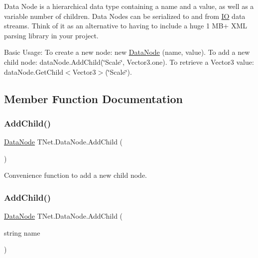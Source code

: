 Data Node is a hierarchical data type containing a name and a value, as well as a variable number of children. Data Nodes can be serialized to and from \mbox{\hyperlink{namespace_t_net_1_1_i_o}{IO}} data streams. Think of it as an alternative to having to include a huge 1 M\+B+ X\+ML parsing library in your project.

Basic Usage\+: To create a new node\+: new \mbox{\hyperlink{class_t_net_1_1_data_node}{Data\+Node}} (name, value). To add a new child node\+: data\+Node.\+Add\+Child(\char`\"{}\+Scale\char`\"{}, Vector3.\+one). To retrieve a Vector3 value\+: data\+Node.\+Get\+Child$<$\+Vector3$>$(\char`\"{}\+Scale\char`\"{}). 

\subsection{Member Function Documentation}
\mbox{\label{class_t_net_1_1_data_node_a379707c85e05f5019e726547ee666e3a}} 
\subsubsection{\texorpdfstring{Add\+Child()}{AddChild()}\hspace{0.1cm}{\footnotesize\ttfamily [1/3]}}
{\footnotesize\ttfamily \mbox{\hyperlink{class_t_net_1_1_data_node}{Data\+Node}} T\+Net.\+Data\+Node.\+Add\+Child (\begin{DoxyParamCaption}{ }\end{DoxyParamCaption})}



Convenience function to add a new child node. 

\mbox{\label{class_t_net_1_1_data_node_aad50f0be4fc418656afa91b2cbcd713d}} 
\subsubsection{\texorpdfstring{Add\+Child()}{AddChild()}\hspace{0.1cm}{\footnotesize\ttfamily [2/3]}}
{\footnotesize\ttfamily \mbox{\hyperlink{class_t_net_1_1_data_node}{Data\+Node}} T\+Net.\+Data\+Node.\+Add\+Child (\begin{DoxyParamCaption}\item[{string}]{name }\end{DoxyParamCaption})}



